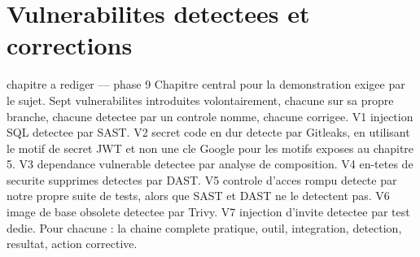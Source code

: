 ﻿%
\chapter{Vulnerabilites detectees et corrections}
\label{chap:vulnerabilites}

\begin{constat}{chapitre a rediger --- phase 9}
Chapitre central pour la demonstration exigee par le sujet. Sept vulnerabilites introduites volontairement, chacune sur sa propre branche, chacune detectee par un controle nomme, chacune corrigee. V1 injection SQL detectee par SAST. V2 secret code en dur detecte par Gitleaks, en utilisant le motif de secret JWT et non une cle Google pour les motifs exposes au chapitre 5. V3 dependance vulnerable detectee par analyse de composition. V4 en-tetes de securite supprimes detectes par DAST. V5 controle d'acces rompu detecte par notre propre suite de tests, alors que SAST et DAST ne le detectent pas. V6 image de base obsolete detectee par Trivy. V7 injection d'invite detectee par test dedie. Pour chacune : la chaine complete pratique, outil, integration, detection, resultat, action corrective.
\end{constat}

